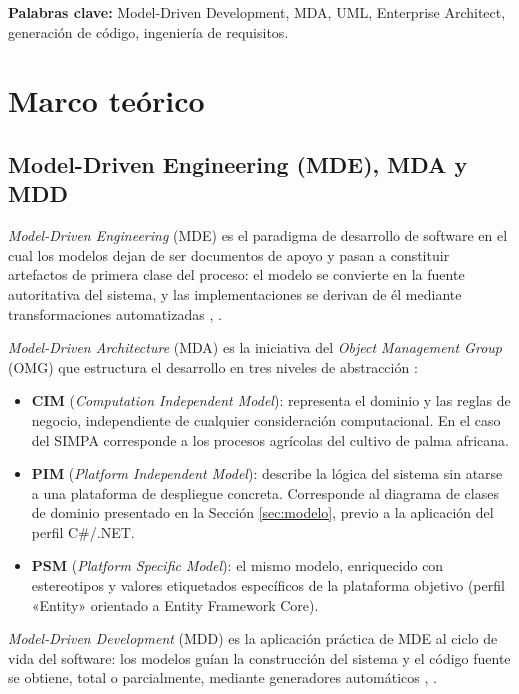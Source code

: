 \documentclass[11pt,a4paper]{article}
\begin{document}
	\vspace{0.3cm}
	\textbf{Palabras clave:} Model-Driven Development, MDA, UML, Enterprise Architect, generación de código, ingeniería de requisitos.
	
	\newpage
	\tableofcontents
	\newpage
	
	\section{Marco teórico}
	
	\subsection{Model-Driven Engineering (MDE), MDA y MDD}
	\textit{Model-Driven Engineering} (MDE) es el paradigma de desarrollo de software en el cual los modelos dejan de ser documentos de apoyo y pasan a constituir artefactos de primera clase del proceso: el modelo se convierte en la fuente autoritativa del sistema, y las implementaciones se derivan de él mediante transformaciones automatizadas \cite{schmidt2006}, \cite{bucchiarone2020}.
	
	\textit{Model-Driven Architecture} (MDA) es la iniciativa del \textit{Object Management Group} (OMG) que estructura el desarrollo en tres niveles de abstracción \cite{omg_mda2014}:
	\begin{itemize}[nosep]
		\item \textbf{CIM} (\textit{Computation Independent Model}): representa el dominio y las reglas de negocio, independiente de cualquier consideración computacional. En el caso del SIMPA corresponde a los procesos agrícolas del cultivo de palma africana.
		\item \textbf{PIM} (\textit{Platform Independent Model}): describe la lógica del sistema sin atarse a una plataforma de despliegue concreta. Corresponde al diagrama de clases de dominio presentado en la Sección \ref{sec:modelo}, previo a la aplicación del perfil C\#/.NET.
		\item \textbf{PSM} (\textit{Platform Specific Model}): el mismo modelo, enriquecido con estereotipos y valores etiquetados específicos de la plataforma objetivo (perfil «Entity» orientado a Entity Framework Core).
	\end{itemize}
	
	\textit{Model-Driven Development} (MDD) es la aplicación práctica de MDE al ciclo de vida del software: los modelos guían la construcción del sistema y el código fuente se obtiene, total o parcialmente, mediante generadores automáticos \cite{selic2003}, \cite{brambilla2017}.
	
\end{document}
